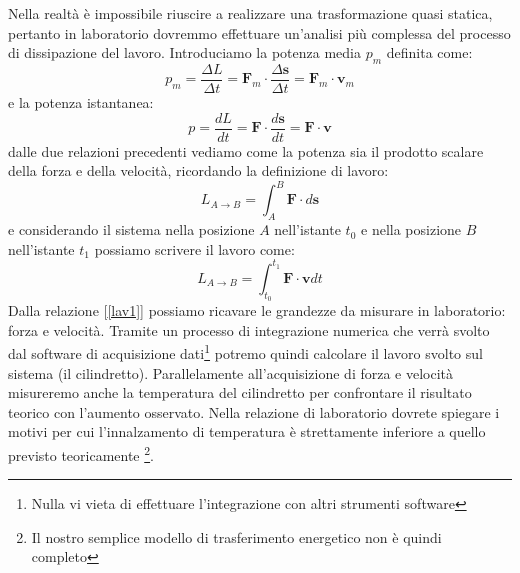 \documentclass[a4paper,10pt,oneside]{article}
\begin{document}
Nella realtà è impossibile riuscire a realizzare una trasformazione quasi statica, pertanto in laboratorio dovremmo effettuare un'analisi più complessa del processo di dissipazione del lavoro.
Introduciamo la potenza media $p_m$ definita come:
\begin{equation}
 p_m=\frac{\Delta L}{\Delta t}=\mathbf{F}_m\cdot \frac{\Delta \mathbf{s}}{\Delta t}=\mathbf{F}_m\cdot\mathbf{v}_m
\end{equation}
e la potenza istantanea:
\begin{equation}
 p=\frac{dL}{dt}=\mathbf{F}\cdot\frac{d\mathbf{s}}{dt}=\mathbf{F}\cdot\mathbf{v}
\end{equation}
dalle due relazioni precedenti vediamo come la potenza sia il prodotto scalare della forza e della velocità, ricordando la definizione di lavoro:
\begin{equation}
 L_{A\to B}=\int_A^B\mathbf{F}\cdot d\mathbf{s}
\end{equation}
e considerando il sistema nella posizione $A$ nell'istante $t_0$ e nella posizione $B$ nell'istante $t_1$ possiamo scrivere il lavoro come:
\begin{equation}\label{lav1}
 L_{A\to B}=\int_{t_0}^{t_1}\mathbf{F}\cdot\mathbf{v}dt
\end{equation}
Dalla relazione [\ref{lav1}] possiamo ricavare le grandezze da misurare in laboratorio: forza e velocità. Tramite un processo di integrazione numerica che verrà svolto dal software di acquisizione dati\footnote{Nulla vi vieta di effettuare l'integrazione con altri strumenti software} potremo quindi calcolare il lavoro svolto sul sistema (il cilindretto). Parallelamente all'acquisizione di forza e velocità misureremo anche la temperatura del cilindretto per confrontare il risultato teorico con l'aumento osservato. Nella relazione di laboratorio dovrete spiegare i motivi per cui l'innalzamento di temperatura è strettamente inferiore a quello previsto teoricamente \footnote{Il nostro semplice modello di trasferimento energetico non è quindi completo}.
\end{document}
